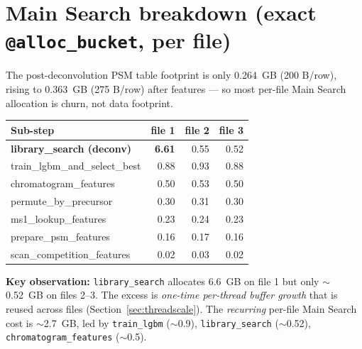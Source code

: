 \documentclass[11pt]{article}
\begin{document}
\section{Main Search breakdown (exact \texttt{@alloc\_bucket}, per file)}
The post-deconvolution PSM table footprint is only \SI{0.264}{GB} (200 B/row),
rising to \SI{0.363}{GB} (275 B/row) after features --- so most per-file Main Search
allocation is churn, not data footprint.
\begin{center}
\begin{tabular}{lrrr}
\toprule
Sub-step & file 1 & file 2 & file 3 \\
\midrule
\textbf{library\_search (deconv)} & \textbf{6.61} & 0.55 & 0.52 \\
train\_lgbm\_and\_select\_best     & 0.88 & 0.93 & 0.88 \\
chromatogram\_features            & 0.50 & 0.53 & 0.50 \\
permute\_by\_precursor            & 0.30 & 0.31 & 0.30 \\
ms1\_lookup\_features             & 0.23 & 0.24 & 0.23 \\
prepare\_psm\_features            & 0.16 & 0.17 & 0.16 \\
scan\_competition\_features       & 0.02 & 0.03 & 0.02 \\
\bottomrule
\end{tabular}
\end{center}
\noindent\textbf{Key observation:} \texttt{library\_search} allocates \SI{6.6}{GB} on
file 1 but only $\sim$\SI{0.52}{GB} on files 2--3. The excess is \emph{one-time
per-thread buffer growth} that is reused across files (Section~\ref{sec:threadscale}).
The \emph{recurring} per-file Main Search cost is $\sim$\SI{2.7}{GB}, led by
\texttt{train\_lgbm} ($\sim$0.9), \texttt{library\_search} ($\sim$0.52),
\texttt{chromatogram\_features} ($\sim$0.5).
\end{document}
